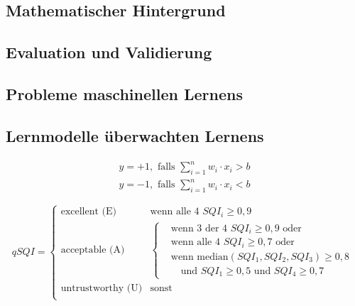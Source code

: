 	\subsection{Mathematischer Hintergrund}
	
	\subsection{Evaluation und Validierung}
	
	\subsection{Probleme maschinellen Lernens}
	
	\subsection{Lernmodelle überwachten Lernens}

	
	


\[
\begin{gathered}
	y = +1, \text{ falls } \sum_{i=1}^{n} w_i \cdot x_i > b \\
	y = -1, \text{ falls } \sum_{i=1}^{n} w_i \cdot x_i < b
\end{gathered}
\]

\[
qSQI = \begin{cases}
	\text{excellent (E)} & \text{wenn alle 4 } SQI_i \geq 0,9\\
	\text{acceptable (A)} & \begin{cases}
		& \text{wenn 3 der 4 } SQI_i \geq 0,9 \text{ oder}\\
		& \text{wenn alle 4 } SQI_i \geq 0,7 \text{ oder}\\
		& \text{wenn median}(SQI_1, SQI_2, SQI_3) \geq 0,8\\&\text{ }\text{	und } SQI_1 \geq 0,5 \text{ und } SQI_4 \geq 0,7
		\end{cases}\\
	\text{untrustworthy (U)} & \text{sonst}\\
\end{cases}
\]


